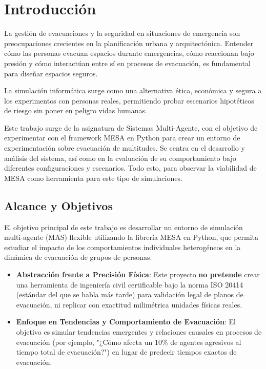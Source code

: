 \documentclass[11pt,spanish,listoffigures,listoftables]{tfgetsinf}
\begin{document}


\mainmatter
\chapter{Introducción}

La gestión de evacuaciones y la seguridad en situaciones de emergencia son preocupaciones crecientes en la planificación urbana y arquitectónica. Entender cómo las personas evacuan espacios durante emergencias, cómo reaccionan bajo presión y cómo interactúan entre sí en procesos de evacuación, es fundamental para diseñar espacios seguros. 

La simulación informática surge como una alternativa ética, económica y segura a los experimentos con personas reales, permitiendo probar escenarios hipotéticos de riesgo sin poner en peligro vidas humanas.

Este trabajo surge de la asignatura de Sistemas Multi-Agente, con el objetivo de experimentar con el framework MESA en Python para crear un entorno de experimentación sobre evacuación de multitudes. Se centra en el desarrollo y análisis del sistema, así como en la evaluación de su comportamiento bajo diferentes configuraciones y escenarios. Todo esto, para observar la viabilidad de MESA como herramienta para este tipo de simulaciones.

\section{Alcance y Objetivos}
 
El objetivo principal de este trabajo es desarrollar un entorno de simulación multi-agente (MAS) flexible utilizando la librería MESA en Python, que permita estudiar el impacto de los comportamientos individuales heterogéneos en la dinámica de evacuación de grupos de personas.

\begin{itemize}
    \item \textbf{Abstracción frente a Precisión Física}: Este proyecto \textbf{no pretende} crear una herramienta de ingeniería civil certificable bajo la norma ISO 20414 (estándar del que se habla más tarde) para validación legal de planos de evacuación, ni replicar con exactitud milimétrica unidades físicas reales.
    \item \textbf{Enfoque en Tendencias y Comportamiento de Evacuación}: El objetivo es simular tendencias emergentes y relaciones causales en procesos de evacuación (por ejemplo, "¿Cómo afecta un 10\% de agentes agresivos al tiempo total de evacuación?") en lugar de predecir tiempos exactos de evacuación.
  
\end{itemize}
\end{document}
